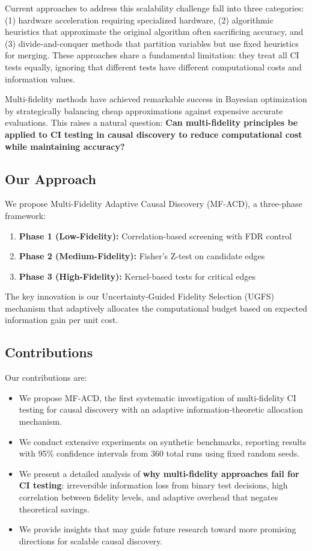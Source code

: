 \documentclass{article}
\begin{document}
Current approaches to address this scalability challenge fall into three categories: (1) hardware acceleration \citep{zarebavani2019cupc} requiring specialized hardware, (2) algorithmic heuristics that approximate the original algorithm often sacrificing accuracy, and (3) divide-and-conquer methods \citep{dong2025dcilp, shanmugam2021hccd} that partition variables but use fixed heuristics for merging. These approaches share a fundamental limitation: they treat all CI tests equally, ignoring that different tests have different computational costs and information values.

Multi-fidelity methods have achieved remarkable success in Bayesian optimization \citep{kandasamy2016gaussian, kandasamy2017multi} by strategically balancing cheap approximations against expensive accurate evaluations. This raises a natural question: \textbf{Can multi-fidelity principles be applied to CI testing in causal discovery to reduce computational cost while maintaining accuracy?}

\subsection{Our Approach}

We propose Multi-Fidelity Adaptive Causal Discovery (MF-ACD), a three-phase framework:
\begin{enumerate}
    \item \textbf{Phase 1 (Low-Fidelity):} Correlation-based screening with FDR control
    \item \textbf{Phase 2 (Medium-Fidelity):} Fisher's Z-test on candidate edges
    \item \textbf{Phase 3 (High-Fidelity):} Kernel-based tests for critical edges
\end{enumerate}

The key innovation is our Uncertainty-Guided Fidelity Selection (UGFS) mechanism that adaptively allocates the computational budget based on expected information gain per unit cost.

\subsection{Contributions}

Our contributions are:
\begin{itemize}
    \item We propose MF-ACD, the first systematic investigation of multi-fidelity CI testing for causal discovery with an adaptive information-theoretic allocation mechanism.
    \item We conduct extensive experiments on synthetic benchmarks, reporting results with 95\% confidence intervals from 360 total runs using fixed random seeds.
    \item We present a detailed analysis of \textbf{why multi-fidelity approaches fail for CI testing}: irreversible information loss from binary test decisions, high correlation between fidelity levels, and adaptive overhead that negates theoretical savings.
    \item We provide insights that may guide future research toward more promising directions for scalable causal discovery.
\end{itemize}
\end{document}
